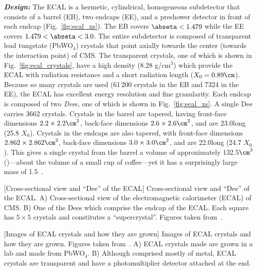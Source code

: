 \textit{\textbf{Design:}}
The ECAL is a hermetic, cylindrical, homogeneous subdetector that consists of a barrel (EB), two endcaps (EE), and a preshower detector in front of each endcap (Fig.~\ref{fig:ecal_xs}).
The EB covers $\abseta < 1.479$ while the EE covers $1.479 < \abseta < 3.0$.
The entire subdetector is composed of transparent lead tungstate (PbWO$_4$) crystals that point axially towards the center (\ie towards the interaction point) of CMS.
The transparent crystals, one of which is shown in Fig.~\ref{fig:ecal_crystals}, have a high density (8.28 g/cm$^3$) which provide the ECAL with radiation resistance and a short radiation length ($X_0 = 0.89\cm$).
Because so many crystals are used (61\,200 crystals in the EB and 7324 in the EE), the ECAL has excellent energy resolution and fine granularity.
Each endcap is composed of two \emph{Dee}s, one of which is shown in Fig.~\ref{fig:ecal_xs}.
A single Dee carries 3662 crystals.
Crystals in the barrel are tapered, having front-face dimensions $2.2 \times 2.2\cm^2$, back-face dimensions $2.6 \times 2.6\cm^2$, and are 23.0\cm long (25.8 $X_0$).
Crystals in the endcaps are also tapered, with front-face dimensions $2.862 \times 2.862\cm^2$, back-face dimensions $3.0 \times 3.0\cm^2$, and are 22.0\cm long (24.7 $X_0$).
This gives a single crystal from the barrel a volume of approximately 132.5$\cm^3$ (\mL)---about the volume of a small cup of coffee---yet it has a surprisingly large mass of 1.5\Kg~\cite{particle_data_group_review_2020}.
\begin{multiFigure}
    \centering
        [Cross-sectional view and ``Dee'' of the ECAL]
        {Cross-sectional view and ``Dee'' of the ECAL.
        \;A) Cross-sectional view of the electromagnetic calorimeter (ECAL) of CMS.
        \;B) One of the Dees which comprise the endcap of the ECAL.
        Each square has $5 \times 5$ crystals and constitutes a ``supercrystal''.
        Figures taken from~\cite{collaboration_cms_2008}.}
    \label{fig:ecal_xs}
\end{multiFigure}
\begin{multiFigure}
    \centering
        [Images of ECAL crystals and how they are grown]
        {Images of ECAL crystals and how they are grown.
        Figures taken from~\cite{ecal_crystal_lab}.
        \;A) ECAL crystals made are grown in a lab and made from PbWO$_4$.
        \;B) Although comprised mostly of metal, ECAL crystals are transparent and have a photomultiplier detector attached at the end.} 
    \label{fig:ecal_crystals}
\end{multiFigure}

